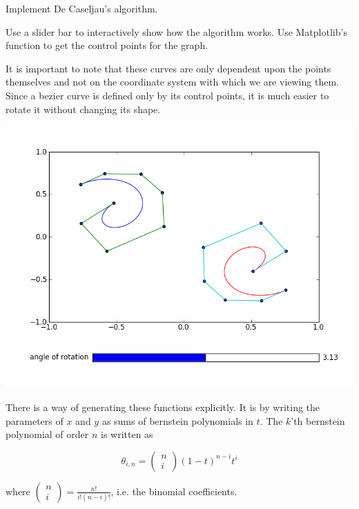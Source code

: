 \begin{problem}
Implement De Caseljau's algorithm.
\end{problem}

\begin{problem}
Use a slider bar to interactively show how the algorithm works. 
Use Matplotlib's  function to get the control points for the graph.
\end{problem}

It is important to note that these curves are only dependent upon the points themselves and not on the coordinate system with which we are viewing them. 
Since a bezier curve is defined only by its control points, it is much easier to rotate it without changing its shape.

\includegraphics[width=\textwidth]{bezier_rotation}

There is a way of generating these functions explicitly. 
It is by writing the parameters of $x$ and $y$ as sums of bernstein polynomials in $t$. 
The $k$'th bernstein polynomial of order $n$ is written as 

$$\theta_{i,n}=\left( \begin{smallmatrix} n\\ i \end{smallmatrix} \right) (1-t)^{n-i} t^i$$

where $\left( \begin{smallmatrix} n\\ i \end{smallmatrix} \right) = \frac{n!}{i!(n-i)!}$, i.e. the binomial coefficients.

